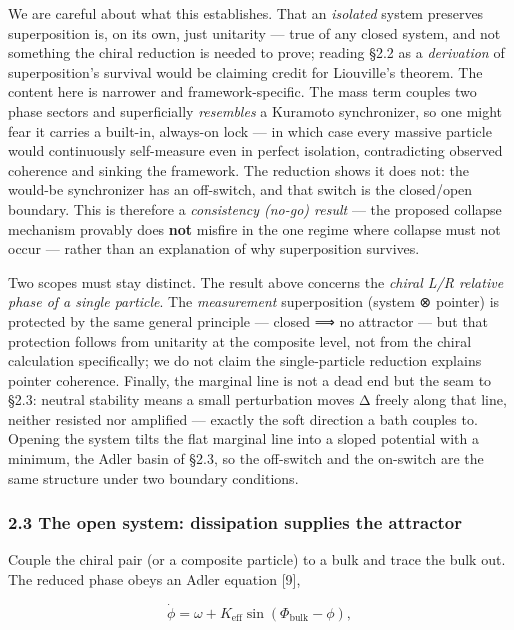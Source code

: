 \documentclass[
]{article}
\begin{document}
We are careful about what this establishes. That an \emph{isolated}
system preserves superposition is, on its own, just unitarity --- true
of any closed system, and not something the chiral reduction is needed
to prove; reading §2.2 as a \emph{derivation} of superposition's
survival would be claiming credit for Liouville's theorem. The content
here is narrower and framework-specific. The mass term couples two phase
sectors and superficially \emph{resembles} a Kuramoto synchronizer, so
one might fear it carries a built-in, always-on lock --- in which case
every massive particle would continuously self-measure even in perfect
isolation, contradicting observed coherence and sinking the framework.
The reduction shows it does not: the would-be synchronizer has an
off-switch, and that switch is the closed/open boundary. This is
therefore a \emph{consistency (no-go) result} --- the proposed collapse
mechanism provably does \textbf{not} misfire in the one regime where
collapse must not occur --- rather than an explanation of why
superposition survives.

Two scopes must stay distinct. The result above concerns the
\emph{chiral L/R relative phase of a single particle}. The
\emph{measurement} superposition (system ⊗ pointer) is protected by the
same general principle --- closed ⟹ no attractor --- but that protection
follows from unitarity at the composite level, not from the chiral
calculation specifically; we do not claim the single-particle reduction
explains pointer coherence. Finally, the marginal line is not a dead end
but the seam to §2.3: neutral stability means a small perturbation moves
Δ freely along that line, neither resisted nor amplified --- exactly the
soft direction a bath couples to. Opening the system tilts the flat
marginal line into a sloped potential with a minimum, the Adler basin of
§2.3, so the off-switch and the on-switch are the same structure under
two boundary conditions.

\subsubsection{2.3 The open system: dissipation supplies the
attractor}\label{the-open-system-dissipation-supplies-the-attractor}

Couple the chiral pair (or a composite particle) to a bulk and trace the
bulk out. The reduced phase obeys an Adler equation {[}9{]},

\[\dot\phi = \omega + K_{\text{eff}}\sin(\Phi_{\text{bulk}} - \phi),\]
\end{document}
